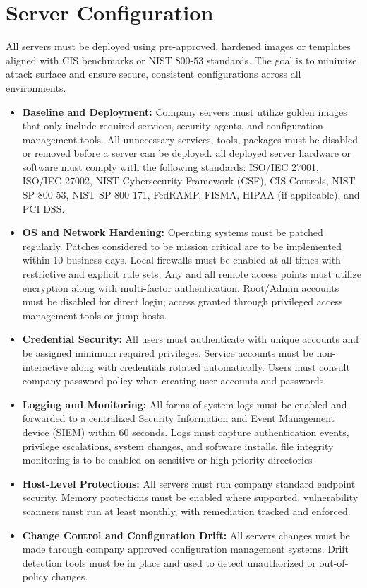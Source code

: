 \section{Server Configuration}
All servers must be deployed using pre-approved, hardened images or templates aligned with CIS benchmarks or NIST 800-53 standards. The goal is to minimize attack surface and ensure secure, consistent configurations across all environments.
\begin{itemize}
    \item \textbf{Baseline and Deployment:}
    Company servers must utilize golden images that only include required services, security agents, and configuration management tools. All unnecessary services, tools, packages must be disabled or removed before a server can be deployed. all deployed server hardware or software must comply with the following standards: ISO/IEC 27001, ISO/IEC 27002, NIST Cybersecurity Framework (CSF), CIS Controls, NIST SP 800-53, NIST SP 800-171, FedRAMP, FISMA, HIPAA (if applicable), and PCI DSS.
    \item \textbf{OS and Network Hardening:}
    Operating systems must be patched regularly. Patches considered to be mission critical are to be implemented within 10 business days. Local firewalls must be enabled at all times with restrictive and explicit rule sets. Any and all remote access points must utilize encryption along with multi-factor authentication. Root/Admin accounts must be disabled for direct login; access granted through privileged access management tools or jump hosts.
    \item \textbf{Credential Security:}
    All users must authenticate with unique accounts and be assigned minimum required privileges. Service accounts must be non-interactive along with credentials rotated automatically. Users must consult company password policy when creating user accounts and passwords.
    \item \textbf{Logging and Monitoring:}
    All forms of system logs must be enabled and forwarded to a centralized Security Information and Event Management device (SIEM) within 60 seconds. Logs must capture authentication events, privilege escalations, system changes, and software installs. file integrity monitoring is to be enabled on sensitive or high priority directories
    \item \textbf{Host-Level Protections:}
    All servers must run company standard endpoint security. Memory protections must be enabled where supported. vulnerability scanners must run at least monthly, with remediation tracked and enforced.
    \item \textbf{Change Control and Configuration Drift:}
    All servers changes must be made through company approved configuration management systems. Drift detection tools must be in place and used to detect unauthorized or out-of-policy changes.
\end{itemize}

